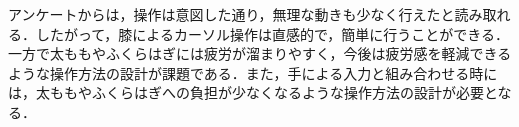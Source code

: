 \documentclass[submit, techrep]{ipsj}
\begin{document}
アンケートからは，操作は意図した通り，無理な動きも少なく行えたと読み取れる．したがって，膝によるカーソル操作は直感的で，簡単に行うことができる．一方で太ももやふくらはぎには疲労が溜まりやすく，今後は疲労感を軽減できるような操作方法の設計が課題である．また，手による入力と組み合わせる時には，太ももやふくらはぎへの負担が少なくなるような操作方法の設計が必要となる．



%
\end{document}
